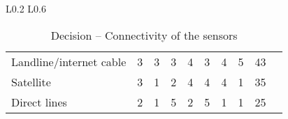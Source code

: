\begin{table}
\begin{tabular}{L{0.2\textwidth} L{0.6\textwidth}}
\begin{tabular}{l|llllllll|l}
		Landline/internet cable  & 3                 & 3                & 3                 & 4                       & 3              & 4                 & 5          & 43                   \\
		Satellite        & 3                 & 1                & 2                 & 4                       & 4              & 4                 & 1          & 35                   \\
		Direct lines     & 2                 & 1                & 5                 & 2                       & 5              & 1                 & 1          & 25                   \\
	\end{tabular} \\ \bottomrule
	\end{tabular}
	\caption{Decision -- Connectivity of the sensors}
	\label{table:connectivitysensors}
\end{table}

